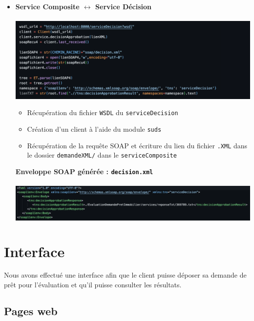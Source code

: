 \documentclass{article}
\begin{document}
\begin{itemize}
\newpage
          \item \textbf{Service Composite $\leftrightarrow$ Service Décision} \\ \\
          \includegraphics[width=\textwidth]{Images/7.3/wsdlDecision.png}\\
          \begin{itemize}
              \item Récupération du fichier \texttt{WSDL} du \texttt{serviceDecision}
              \item Création d'un client à l'aide du module \texttt{suds}
              \item Récupération de la requête SOAP et écriture du lien du fichier \texttt{.XML} dans le dossier \texttt{demandeXML/} dans le \texttt{serviceComposite}
          \end{itemize}
          \textbf{Enveloppe SOAP générée : \texttt{decision.xml}}\\ \\
          \includegraphics[width=\textwidth]{Images/7.3/SOAPDecision.png}
          
      \end{itemize}

  \newpage

\section{Interface}
    Nous avons effectué une interface afin que le client puisse déposer sa demande de prêt pour l'évaluation et qu'il puisse consulter les résultats.
    
    \subsection{Pages web}
\end{document}
